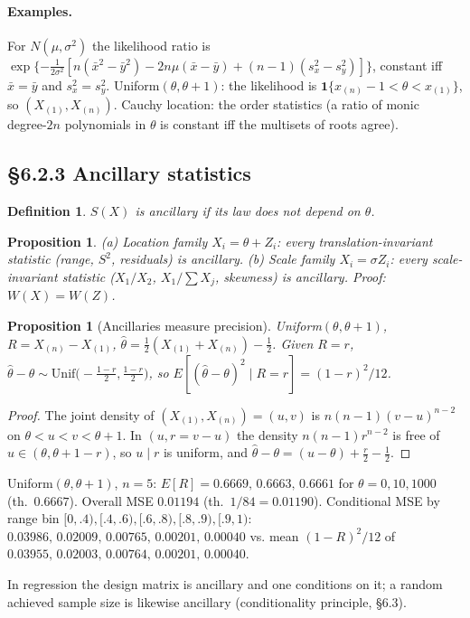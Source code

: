 \documentclass[11pt]{article}
\newtheorem{definition}[theorem]{Definition}
\newtheorem{proposition}[theorem]{Proposition}
\newcommand{\ind}{\mathbf 1}
\begin{document}
\paragraph{Examples.} For $N(\mu,\sigma^2)$ the likelihood ratio is $\exp\{-\frac1{2\sigma^2}[n(\bar x^2-\bar y^2)-2n\mu(\bar x-\bar y)+(n-1)(s_x^2-s_y^2)]\}$, constant iff $\bar x=\bar y$ and $s_x^2=s_y^2$. Uniform$(\theta,\theta+1)$: the likelihood is $\ind\{x_{(n)}-1<\theta<x_{(1)}\}$, so $(X_{(1)},X_{(n)})$. Cauchy location: the order statistics (a ratio of monic degree-$2n$ polynomials in $\theta$ is constant iff the multisets of roots agree).

\subsection{\S6.2.3 Ancillary statistics}
\begin{definition}
$S(X)$ is \emph{ancillary} if its law does not depend on $\theta$.
\end{definition}
\begin{proposition}
(a) Location family $X_i=\theta+Z_i$: every translation-invariant statistic (range, $S^2$, residuals) is ancillary. (b) Scale family $X_i=\sigma Z_i$: every scale-invariant statistic ($X_1/X_2$, $X_1/\sum X_j$, skewness) is ancillary. Proof: $W(X)=W(Z)$.
\end{proposition}
\begin{proposition}[Ancillaries measure precision]
Uniform$(\theta,\theta+1)$, $R=X_{(n)}-X_{(1)}$, $\hat\theta=\frac12(X_{(1)}+X_{(n)})-\frac12$. Given $R=r$, $\hat\theta-\theta\sim\mathrm{Unif}\big(-\frac{1-r}2,\frac{1-r}2\big)$, so $E[(\hat\theta-\theta)^2\mid R=r]=(1-r)^2/12$.
\end{proposition}
\begin{proof}
The joint density of $(X_{(1)},X_{(n)})=(u,v)$ is $n(n-1)(v-u)^{n-2}$ on $\theta<u<v<\theta+1$. In $(u,r=v-u)$ the density $n(n-1)r^{n-2}$ is free of $u\in(\theta,\theta+1-r)$, so $u\mid r$ is uniform, and $\hat\theta-\theta=(u-\theta)+\frac r2-\frac12$.
\end{proof}
\begin{simbox}
Uniform$(\theta,\theta+1)$, $n=5$: $E[R]=0.6669,\,0.6663,\,0.6661$ for $\theta=0,10,1000$ (th.\ $0.6667$). Overall MSE $0.01194$ (th.\ $1/84=0.01190$). Conditional MSE by range bin $[0,.4),[.4,.6),[.6,.8),[.8,.9),[.9,1)$: $0.03986,\,0.02009,\,0.00765,\,0.00201,\,0.00040$ vs. mean $(1-R)^2/12$ of $0.03955,\,0.02003,\,0.00764,\,0.00201,\,0.00040$.
\end{simbox}
In regression the design matrix is ancillary and one conditions on it; a random achieved sample size is likewise ancillary (conditionality principle, \S6.3).
\end{document}
